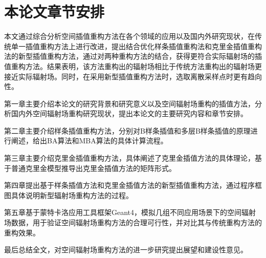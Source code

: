 \section{本论文章节安排}
本文通过综合分析空间插值重构方法在各个领域的应用以及国内外研究现状，在传统单一插值重构方法上进行改进，提出结合优化样条插值重构法和克里金插值重构法的新型插值重构方法，通过对两种重构方法的结合，获得更符合实际辐射场的插值重构方法。结果表明，该方法重构出的辐射场相比于传统方法重构出的辐射场更接近实际辐射场。同时，在采用新型插值重构方法时，选取离散采样点时更有趋向性。

第一章主要介绍本论文的研究背景和研究意义以及空间辐射场重构的插值方法，分析国内外空间辐射场重构研究现状，提出本论文的主要研究内容和章节安排。

第二章主要介绍样条插值重构方法，分别对B样条插值和多层B样条插值的原理进行阐述，给出BA算法和MBA算法的具体计算流程。

第三章主要介绍克里金插值重构方法，具体阐述了克里金插值方法的具体理论，基于普通克里金模型推导出克里金插值方法的矩阵形式。

第四章提出基于样条插值方法和克里金插值方法的新型插值重构方法，通过程序框图具体说明新型辐射场重构方法的过程。

第五章基于蒙特卡洛应用工具框架Geant4，模拟几组不同应用场景下的空间辐射场数据，用于验证空间辐射场重构方法的合理可行性，并对比其与传统重构方法的重构效果。

最后总结全文，对空间辐射场重构方法的进一步研究提出展望和建设性意见。